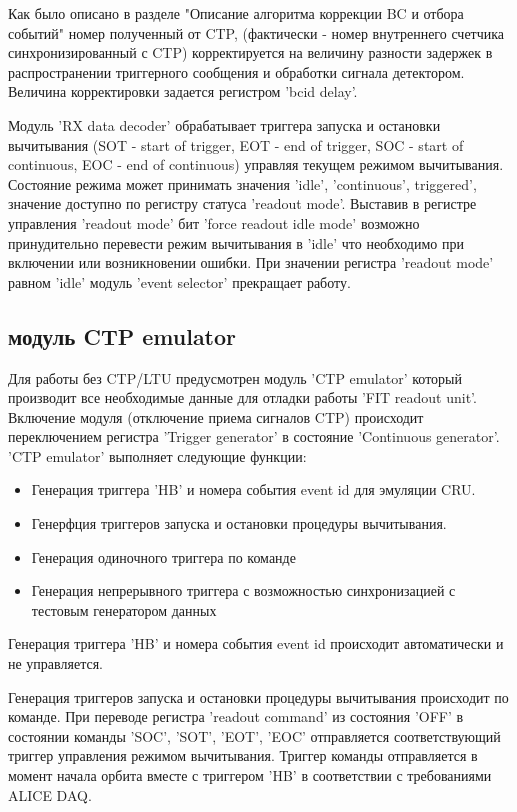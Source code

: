 \documentclass{article}
\begin{document}
Как было описано в разделе "Описание алгоритма коррекции BC и отбора событий" номер полученный от CTP, (фактически - номер внутреннего счетчика синхронизированный с CTP) корректируется на величину разности задержек в распространении триггерного сообщения и обработки сигнала детектором. Величина корректировки задается регистром 'bcid delay'.

Модуль 'RX data decoder' обрабатывает триггера запуска и остановки вычитывания (SOT - start of trigger, EOT - end of trigger, SOC - start of continuous, EOC - end of continuous) управляя текущем режимом вычитывания. Состояние режима может принимать значения 'idle', 'continuous', triggered', значение доступно по регистру статуса 'readout mode'. Выставив в регистре управления 'readout mode' бит 'force readout idle mode' возможно принудительно перевести режим вычитывания в 'idle' что необходимо при включении или возникновении ошибки. При значении регистра 'readout mode' равном 'idle' модуль 'event selector' прекращает работу.




\subsection{модуль CTP emulator}
Для работы без CTP/LTU предусмотрен модуль 'CTP emulator' который производит все необходимые данные для отладки работы 'FIT readout unit'. Включение модуля (отключение приема сигналов CTP) происходит переключением регистра 'Trigger generator' в состояние 'Continuous generator'. 'CTP emulator' выполняет следующие функции:
\begin{itemize}
\item Генерация триггера 'HB' и номера события event id для эмуляции CRU.
\item Генерфция триггеров запуска и остановки процедуры вычитывания.
\item Генерация одиночного триггера по команде
\item Генерация непрерывного триггера с возможностью синхронизацией с тестовым генератором данных
\end{itemize}
Генерация триггера 'HB' и номера события event id происходит автоматически и не управляется.

Генерация триггеров запуска и остановки процедуры вычитывания происходит по команде. При переводе регистра 'readout command' из состояния 'OFF' в состоянии команды 'SOC', 'SOT', 'EOT', 'EOC' отправляется соответствующий триггер управления режимом вычитывания. Триггер команды отправляется в момент начала орбита вместе с триггером 'HB' в соответствии с требованиями ALICE DAQ.
\end{document}
